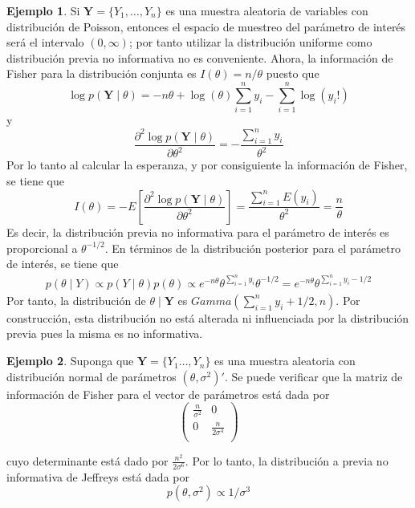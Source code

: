 \documentclass[
  10pt,
  spanish,
]{book}
\theoremstyle{definition}
\theoremstyle{definition}
\newtheorem{example}{Ejemplo}[chapter]
\theoremstyle{definition}
\theoremstyle{definition}
\theoremstyle{remark}
\begin{document}
\begin{example}
\protect\hypertarget{exm:EjemPoisson}{}{\label{exm:EjemPoisson} }Si \(\mathbf{Y}=\{Y_1,\ldots,Y_n\}\) es una muestra aleatoria de variables con distribución de Poisson, entonces el espacio de muestreo del parámetro de interés será el intervalo \((0,\infty)\); por tanto utilizar la distribución uniforme como distribución previa no informativa no es conveniente. Ahora, la información de Fisher para la distribución conjunta es \(I(\theta)=n/\theta\) puesto que
\begin{equation*}
\log p(\mathbf{Y} \mid \theta)=-n\theta+\log(\theta)\sum_{i=1}^ny_i-\sum_{i=1}^n\log(y_i!)
\end{equation*}
y
\begin{equation*}
\frac{\partial^2 \log p(\mathbf{Y} \mid \theta)}{\partial\theta^2}=-\frac{\sum_{i=1}^ny_i}{\theta^2}
\end{equation*}
Por lo tanto al calcular la esperanza, y por consiguiente la información de Fisher, se tiene que
\begin{equation*}
I(\theta)=- E\left[\frac{\partial^2 \log p(\mathbf{Y} \mid \theta)}{\partial\theta^2}\right]
=\frac{\sum_{i=1}^nE(y_i)}{\theta^2}=\frac{n}{\theta}
\end{equation*}
Es decir, la distribución previa no informativa para el parámetro de interés es proporcional a \(\theta^{-1/2}\). En términos de la distribución posterior para el parámetro de interés, se tiene que
\begin{align*}
p(\theta \mid Y) \propto p(Y \mid \theta) p(\theta) \propto e^{-n\theta} \theta^{\sum_{i=1}^ny_i}\theta^{-1/2}
=e^{-n\theta} \theta^{\sum_{i=1}^ny_i-1/2}
\end{align*}
Por tanto, la distribución de \(\theta \mid \mathbf{Y}\) es \(Gamma(\sum_{i=1}^ny_i+1/2,n)\). Por construcción, esta distribución no está alterada ni influenciada por la distribución previa pues la misma es no informativa.
\end{example}

\begin{example}
\protect\hypertarget{exm:unnamed-chunk-19}{}{\label{exm:unnamed-chunk-19} }Suponga que \(\mathbf{Y}=\{Y_1\ldots, Y_n\}\) es una muestra aleatoria con distribución normal de parámetros \((\theta, \sigma^2)'\). Se puede verificar que la matriz de información de Fisher para el vector de parámetros está dada por
\begin{equation}
\begin{pmatrix}
  \frac{n}{\sigma^2} & 0 \\
  0 & \frac{n}{2\sigma^4} \\
\end{pmatrix}
\end{equation}

cuyo determinante está dado por \(\frac{n^2}{2\sigma^6}\). Por lo tanto, la distribución a previa no informativa de Jeffreys está dada por
\begin{equation}
p(\theta,\sigma^2)\propto 1/\sigma^3
\end{equation}
\end{example}
\end{document}
